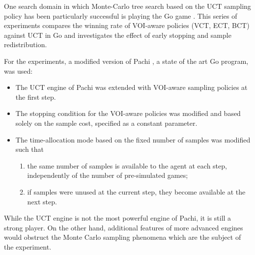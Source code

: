\documentclass{article}
\begin{document}
One search domain in which Monte-Carlo tree search based on the UCT
sampling policy has been particularly successful is playing the Go
game \cite{Gelly.mogo}. This series of experiments compares
the winning rate of VOI-aware policies (VCT, ECT, BCT) against UCT 
in Go and investigates the effect of early stopping and sample
redistribution. 

For the experiments, a modified version of Pachi \cite{Braudis.pachi},
a state of the art Go program, was used:
\begin{itemize}
\item The UCT engine of Pachi was extended with VOI-aware sampling
  policies at the first step. 
\item The stopping condition for the VOI-aware policies was
  modified and based solely on the sample cost, specified as
  a constant parameter. 
\item The time-allocation mode based on the fixed number of samples
  was modified such that 
  \begin{enumerate}
    \item the same number of samples is available to
      the agent at each step, independently of the number of pre-simulated
      games;  
    \item if samples were unused at the current step,
      they become available at the next step.
  \end{enumerate}
\end{itemize}
While the UCT engine is not the most powerful engine of Pachi, it is still
a strong player. On the other hand, additional
features of more advanced engines would obstruct the Monte Carlo
sampling phenomena which are the subject of the experiment.
\end{document}
